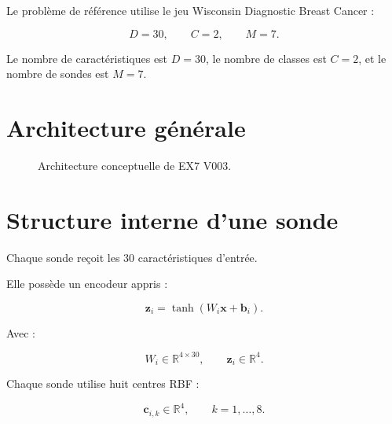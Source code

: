 \documentclass[11pt,a4paper]{report}
\newcommand{\R}{\mathbb{R}}
\newcommand{\softmax}{\operatorname{softmax}}
\newcommand{\RBF}{\operatorname{RBF}}
\newcommand{\vect}[1]{\bm{#1}}
\begin{document}
Le problème de référence utilise le jeu Wisconsin Diagnostic
Breast Cancer :

\[
D=30,\qquad C=2,\qquad M=7.
\]

Le nombre de caractéristiques est \(D=30\), le nombre
de classes est \(C=2\), et le nombre de sondes est \(M=7\).

\section{Architecture générale}

\begin{figure}[H]
\centering
{}
\caption{Architecture conceptuelle de EX7 V003.}
\end{figure}

\section{Structure interne d'une sonde}

Chaque sonde reçoit les 30 caractéristiques d'entrée.

Elle possède un encodeur appris :

\[
\vect{z}_i
=
\tanh(W_i\vect{x}+\vect{b}_i).
\]

Avec :

\[
W_i\in\R^{4\times 30},
\qquad
\vect{z}_i\in\R^4.
\]

Chaque sonde utilise huit centres RBF :

\[
\vect{c}_{i,k}\in\R^4,
\qquad k=1,\ldots,8.
\]
\end{document}
